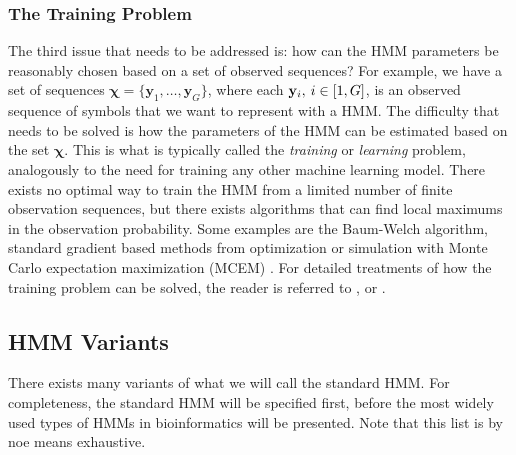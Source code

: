 \documentclass{article}\usepackage[]{graphicx}\usepackage[]{color}
\begin{document}
\subsubsection{The Training Problem} \label{Section:TrainingProblem}
The third issue that needs to be addressed is: how can the HMM parameters be reasonably chosen based on a set of observed sequences? For example, we have a set of sequences $\mathbf{\chi} = \{\mathbf{y}_1, \ldots, \mathbf{y}_G\}$, where each $\mathbf{y}_i, \hspace{0.2em} i \in [1,G]$, is an observed sequence of symbols that we want to represent with a HMM. The difficulty that needs to be solved is how the parameters of the HMM can be estimated based on the set $\mathbf{\chi}$. This is what is typically called the \textit{training} or \textit{learning} problem, analogously to the need for training any other machine learning model. There exists no optimal way to train the HMM from a limited number of finite observation sequences, but there exists algorithms that can find local maximums in the observation probability. Some examples are the Baum-Welch algorithm, standard gradient based methods from optimization or simulation with Monte Carlo expectation maximization (MCEM) \cite{Yoon2009}. For detailed treatments of how the training problem can be solved, the reader is referred to \cite{Rabiner1989}, \cite{Isaev2006} or \cite{Durbin1998}.

\subsection{HMM Variants}
There exists many variants of what we will call the standard HMM. For completeness, the standard HMM will be specified first, before the most widely used types of HMMs in bioinformatics will be presented. Note that this list is by noe means exhaustive. 

\end{document}
